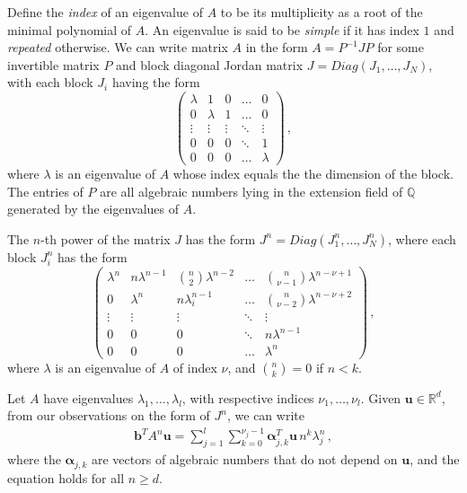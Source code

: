 Define the \emph{index} of an eigenvalue of $A$ to be its multiplicity
as a root of the minimal polynomial of $A$. An eigenvalue is said to be \textit{simple} if it has index $1$ and \textit{repeated} otherwise. We can write matrix $A$
in the form $A=P^{-1}JP$ for some invertible matrix $P$ and block
diagonal Jordan matrix $J=\mathit{Diag}(J_1,\ldots,J_N)$, with each
block $J_i$ having the form
\[\begin{pmatrix} \lambda & 1 & 0 & \ldots & 0\\
                     0 & \lambda & 1& \ldots & 0\\
                    \vdots & \vdots & \vdots & \ddots & \vdots\\
                   0 & 0 & 0 & \ddots & 1\\
                   0 & 0 & 0 & \ldots & \lambda
\end{pmatrix} \, ,\]
where $\lambda$ is an eigenvalue of $A$ whose index equals the the dimension of the block.
  The entries of $P$
are all algebraic numbers lying in the
extension field of $\mathbb{Q}$ generated by the eigenvalues of $A$.

The $n$-th power of the matrix $J$ has the form
$J^n=\mathit{Diag}(J^n_1,\ldots,J^n_N)$, where each block $J_i^n$ has the form
\[\begin{pmatrix}
\lambda^n & n\lambda^{n-1} & \binom{n}{2}\lambda^{n-2}
& \ldots & \binom{n}{\nu-1}\lambda^{n-\nu+1}\\

0 & \lambda^n & n\lambda_i^{n-1} & \ldots &
\binom{n}{\nu-2}\lambda^{n-\nu+2}\\

\vdots & \vdots & \vdots & \ddots & \vdots\\
                   0 & 0 & 0 & \ddots & n\lambda^{n-1}\\
                   0 & 0 & 0 & \ldots & \lambda^n
                 \end{pmatrix} \, ,\] where $\lambda$ is an eigenvalue of $A$ of index $\nu$, and $\binom{n}{k}=0$ if $n<k$.


                 Let $A$ have eigenvalues $\lambda_1,\ldots,\lambda_l$,
                 with respective indices $\nu_1,\ldots,\nu_l$.
Given $\boldsymbol{u}\in\mathbb{R}^d$, from
                 our observations on the form of $J^n$, we can write
\begin{gather}
\boldsymbol{b}^TA^n\boldsymbol{u} =
\sum_{j=1}^l \sum_{k=0}^{\nu_j-1}
\boldsymbol{\alpha}_{j,k}^T\boldsymbol{u}\, n^k\lambda_j^n \, ,
\label{eq:master}
\end{gather}
where the $\boldsymbol{\alpha}_{j,k}$ are vectors of algebraic numbers
that do not depend on $\boldsymbol{u}$, and the equation holds for all
$n\geq d$.

